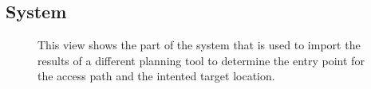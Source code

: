 



\subsection{System} \label{contributions:dbs:system}
\begin{figure}
\caption{This view shows the part of the system that is used to import the results of a different planning tool to determine the entry point for the access path and the intented target location.}
\label{contributions:dbs:planning}
\end{figure}





